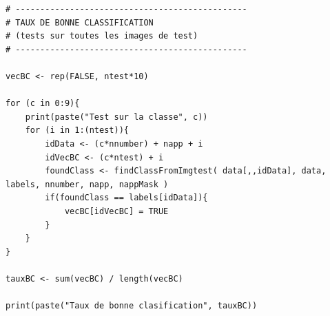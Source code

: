 \documentclass[a4paper,11pt]{article}
\begin{document}
\begin{lstlisting}[caption=Macro testant les images de test]
# -----------------------------------------------
# TAUX DE BONNE CLASSIFICATION
# (tests sur toutes les images de test)
# -----------------------------------------------

vecBC <- rep(FALSE, ntest*10)

for (c in 0:9){
    print(paste("Test sur la classe", c))
    for (i in 1:(ntest)){
        idData <- (c*nnumber) + napp + i
        idVecBC <- (c*ntest) + i
        foundClass <- findClassFromImgtest( data[,,idData], data, labels, nnumber, napp, nappMask )
        if(foundClass == labels[idData]){
            vecBC[idVecBC] = TRUE   
        }
    }
}

tauxBC <- sum(vecBC) / length(vecBC)

print(paste("Taux de bonne clasification", tauxBC))
  \end{lstlisting}

  
\end{document}
